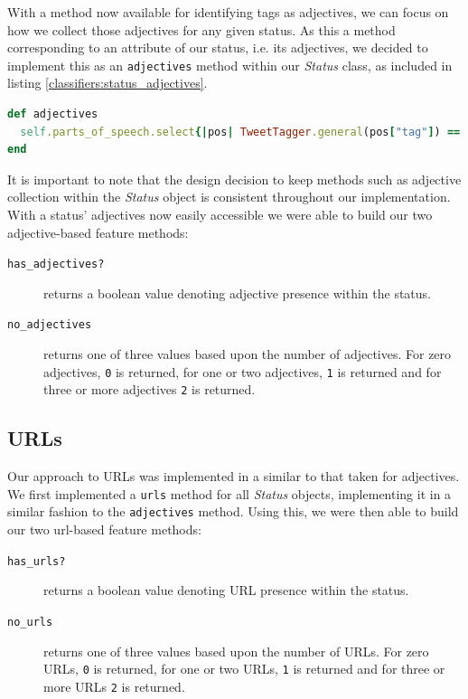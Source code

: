 With a method now available for identifying tags as adjectives, we can focus on how we collect those adjectives for any given status. As this a method corresponding to an attribute of our status, i.e. its adjectives, we decided to implement this as an \texttt{adjectives} method within our \emph{Status} class, as included in listing \ref{classifiers:status_adjectives}.

\begin{lstlisting}[language=Ruby, caption={\emph{Status} object method for returning its adjectives}, label=classifiers:status_adjectives]
def adjectives
  self.parts_of_speech.select{|pos| TweetTagger.general(pos["tag"]) == "adj"}
end
\end{lstlisting}

It is important to note that the design decision to keep methods such as adjective collection within the \emph{Status} object is consistent throughout our implementation. With a status' adjectives now easily accessible we were able to build our two adjective-based feature methods:

\begin{description}
	\item [\texttt{has\_adjectives?}] returns a boolean value denoting adjective presence within the status.
	\item [\texttt{no\_adjectives}] returns one of three values based upon the number of adjectives. For zero adjectives, \texttt{0} is returned, for one or two adjectives, \texttt{1} is returned and for three or more adjectives \texttt{2} is returned.
\end{description}

\subsection{URLs}

Our approach to URLs was implemented in a similar to that taken for adjectives. We first implemented a \texttt{urls} method for all \emph{Status} objects, implementing it in a similar fashion to the \texttt{adjectives} method. Using this, we were then able to build our two url-based feature methods:

\begin{description}
	\item [\texttt{has\_urls?}] returns a boolean value denoting URL presence within the status.
	\item [\texttt{no\_urls}] returns one of three values based upon the number of URLs. For zero URLs, \texttt{0} is returned, for one or two URLs, \texttt{1} is returned and for three or more URLs \texttt{2} is returned.
\end{description}

